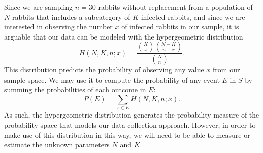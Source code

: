 \documentclass{amsart}
\begin{document}
Since we are sampling $n=30$ rabbits without replacement from a population of $N$ rabbits that includes a subcategory of $K$ infected rabbits, and since we are interested in observing the number $x$ of infected rabbits in our sample, it is arguable that our data can be modeled with the hypergeometric distribution
\[
H(N,K,n;x)=\frac{\binom{K}{x}\binom{N-K}{n-x}}{\binom{N}{n}}.
\]
This distribution predicts the probability of observing any value $x$ from our sample space. We may use it to compute the probability of any event $E$ in $S$ by summing the probabilities of each outcome in $E$:
\[
P(E)=\sum_{x\in E} H(N,K,n;x).
\]
As such, the hypergeometric distribution generates the probability measure of the probability space that models our data collection approach. However, in order to make use of this distribution in this way, we will need to be able to measure or estimate the unknown parameters $N$ and $K$.
\end{document}
